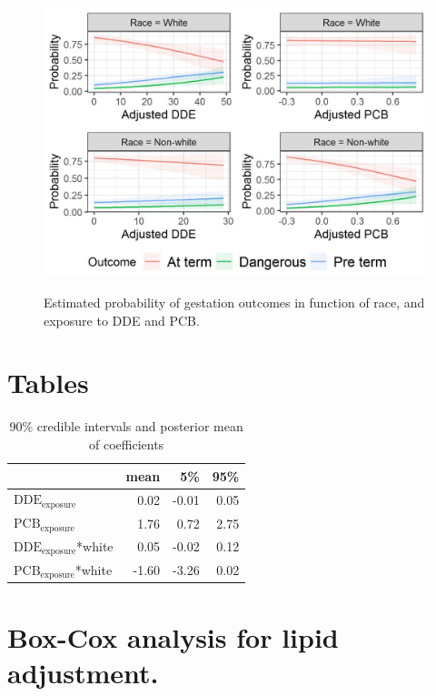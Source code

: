 \documentclass[10pt]{jmlr}%
\begin{document}
\begin{figure}[htbp]
	\centering
	\caption{Estimated probability of gestation outcomes in function of race, and exposure to DDE and PCB.}
	\includegraphics[width=0.7\linewidth]{results}
	\label{fig:results}
\end{figure}


\newpage %
\section{Tables}
\begin{table}
	\centering
	\begin{tabular}{lrrr}
		\toprule
		& mean & 5\% & 95\%\\
		\midrule
		$\text{DDE}_{\text{exposure}}$ & 0.02 & -0.01 & 0.05\\
		$\text{PCB}_{\text{exposure}}$& 1.76 & 0.72 & 2.75\\
		$\text{DDE}_{\text{exposure}}$*white & 0.05 & -0.02 & 0.12\\
		$\text{PCB}_{\text{exposure}}$*white & -1.60 & -3.26 & 0.02\\
		\bottomrule
	\end{tabular}
	\caption{\label{tab:confints} 90\% credible intervals and posterior mean of coefficients}
\end{table}
\newpage  %

\section{Box-Cox analysis for lipid adjustment.}
\end{document}
